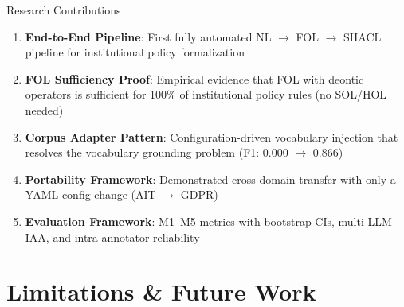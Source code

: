 \documentclass[aspectratio=169, 10pt]{beamer}
\begin{document}
\begin{frame}{Research Contributions}
    \begin{enumerate}
        \item \textbf{End-to-End Pipeline}: First fully automated NL $\rightarrow$ FOL $\rightarrow$ SHACL pipeline for institutional policy formalization
        
        \vspace{0.2cm}
        \item \textbf{FOL Sufficiency Proof}: Empirical evidence that FOL with deontic operators is sufficient for 100\% of institutional policy rules (no SOL/HOL needed)
        
        \vspace{0.2cm}
        \item \textbf{Corpus Adapter Pattern}: Configuration-driven vocabulary injection that resolves the vocabulary grounding problem (F1: 0.000 $\rightarrow$ 0.866)
        
        \vspace{0.2cm}
        \item \textbf{Portability Framework}: Demonstrated cross-domain transfer with only a YAML config change (AIT $\rightarrow$ GDPR)
        
        \vspace{0.2cm}
        \item \textbf{Evaluation Framework}: M1--M5 metrics with bootstrap CIs, multi-LLM IAA, and intra-annotator reliability
    \end{enumerate}
\end{frame}

\section{Limitations \& Future Work}
\end{document}
